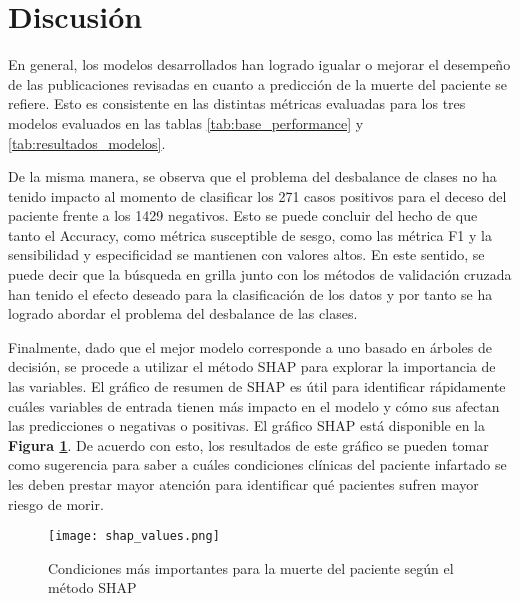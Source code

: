 \documentclass[conference]{IEEEtran}
\begin{document}
\section{\textbf{Discusión}}
En general, los modelos desarrollados han logrado igualar o mejorar el desempeño de las publicaciones revisadas en cuanto a predicción de la muerte del paciente se refiere. Esto es consistente en las distintas métricas evaluadas para los tres modelos evaluados en las tablas \ref{tab:base_performance} y \ref{tab:resultados_modelos}. 

De la misma manera, se observa que el problema del desbalance de clases no ha tenido impacto al momento de clasificar los 271 casos positivos para el deceso del paciente frente a los 1429 negativos. Esto se puede concluir del hecho de que tanto el Accuracy, como métrica susceptible de sesgo, como las métrica F1 y la sensibilidad y especificidad se mantienen con valores altos. En este sentido, se puede decir que la búsqueda en grilla junto con los métodos de validación cruzada han tenido el efecto deseado para la clasificación de los datos y por tanto se ha logrado abordar el problema del desbalance de las clases.

Finalmente, dado que el mejor modelo corresponde a uno basado en árboles de decisión, se procede a utilizar el método SHAP para explorar la importancia de las variables. El gráfico de resumen de SHAP es útil para identificar rápidamente cuáles variables de entrada tienen más impacto en el modelo y cómo sus afectan las predicciones o negativas o positivas. El gráfico SHAP está disponible en la \textbf{Figura \ref{shap}}. De acuerdo con esto, los resultados de este gráfico se pueden tomar como sugerencia para saber a cuáles condiciones clínicas del paciente infartado se les deben prestar mayor atención para identificar qué pacientes sufren mayor riesgo de morir. 

\begin{figure}[htbp!]
  \centering
  \texttt{[image: shap\_values.png]} 
  \caption{Condiciones más importantes para la muerte del paciente según el método SHAP}
  \label{shap}
\end{figure}
\end{document}
